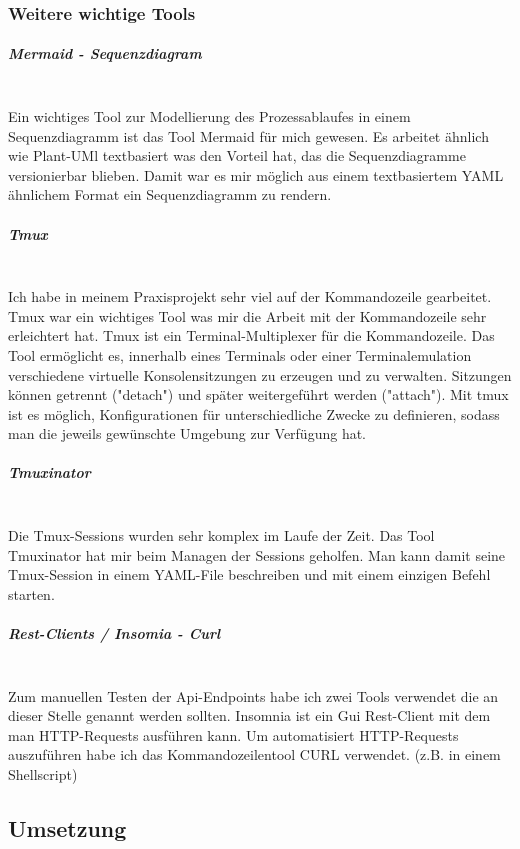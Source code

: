 \documentclass[12pt]{article}
\begin{document}
\subsubsection{Weitere wichtige Tools}

\subparagraph{Mermaid - Sequenzdiagram}\mbox{}\\

Ein wichtiges Tool zur Modellierung des Prozessablaufes in einem Sequenzdiagramm ist das Tool Mermaid\cite{MERMAID} für mich gewesen. Es arbeitet ähnlich wie Plant-UMl textbasiert was den Vorteil hat, das die Sequenzdiagramme versionierbar blieben. Damit war es mir möglich aus einem textbasiertem YAML ähnlichem Format ein Sequenzdiagramm zu rendern.

\subparagraph{Tmux}\mbox{}\\

Ich habe in meinem Praxisprojekt sehr viel auf der Kommandozeile gearbeitet. Tmux\cite{TMUX} war ein wichtiges Tool was mir die Arbeit mit der Kommandozeile sehr erleichtert hat.
Tmux ist ein Terminal-Multiplexer für die Kommandozeile. Das Tool ermöglicht es, innerhalb eines Terminals oder einer Terminalemulation verschiedene virtuelle Konsolensitzungen zu erzeugen und zu verwalten. Sitzungen können getrennt ("detach") und später weitergeführt werden ("attach"). Mit tmux ist es möglich, Konfigurationen für unterschiedliche Zwecke zu definieren, sodass man die jeweils gewünschte Umgebung zur Verfügung hat.

\subparagraph{Tmuxinator}\mbox{}\\

Die Tmux-Sessions wurden sehr komplex im Laufe der Zeit. Das Tool Tmuxinator\cite{TMUXINATOR} hat mir beim Managen der Sessions geholfen. Man kann damit seine Tmux-Session in einem YAML-File beschreiben und mit einem einzigen Befehl starten.




\subparagraph{Rest-Clients / Insomia - Curl}\mbox{}\\

Zum manuellen Testen der Api-Endpoints habe ich zwei Tools verwendet die an dieser Stelle genannt werden sollten. Insomnia\cite{INSOMNIA} ist ein Gui Rest-Client mit dem man HTTP-Requests ausführen kann. Um automatisiert HTTP-Requests auszuführen habe ich das Kommandozeilentool CURL\cite{CURL} verwendet. (z.B. in einem Shellscript)

\newpage
\subsection{Umsetzung}
\end{document}
